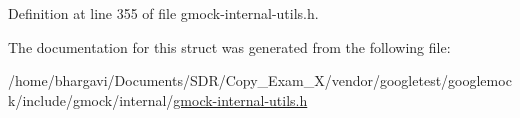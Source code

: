 Definition at line 355 of file gmock-\/internal-\/utils.\+h.



The documentation for this struct was generated from the following file\+:\begin{DoxyCompactItemize}
\item 
/home/bhargavi/\+Documents/\+S\+D\+R/\+Copy\+\_\+\+Exam\+\_\+X/vendor/googletest/googlemock/include/gmock/internal/\hyperlink{gmock-internal-utils_8h}{gmock-\/internal-\/utils.\+h}\end{DoxyCompactItemize}

